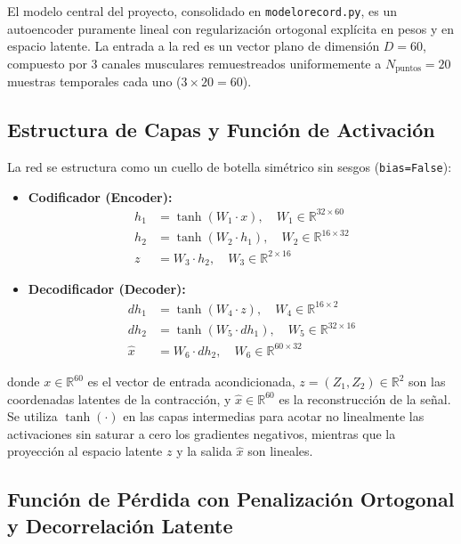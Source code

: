\documentclass[11pt,a4paper,openany]{book}
\theoremstyle{definition}
\begin{document}
El modelo central del proyecto, consolidado en \texttt{modelorecord.py}, es un autoencoder puramente lineal con regularización ortogonal explícita en pesos y en espacio latente. La entrada a la red es un vector plano de dimensión $D = 60$, compuesto por 3 canales musculares remuestreados uniformemente a $N_{\text{puntos}} = 20$ muestras temporales cada uno ($3 \times 20 = 60$).

\subsection{Estructura de Capas y Función de Activación}
\label{subsec:estructura_capas}

La red se estructura como un cuello de botella simétrico sin sesgos (\texttt{bias=False}):
\begin{itemize}
    \item \textbf{Codificador (Encoder):}
    \begin{align}
        h_1 &= \tanh(W_1 \cdot x), \quad W_1 \in \mathbb{R}^{32 \times 60} \\
        h_2 &= \tanh(W_2 \cdot h_1), \quad W_2 \in \mathbb{R}^{16 \times 32} \\
        z &= W_3 \cdot h_2, \quad W_3 \in \mathbb{R}^{2 \times 16}
    \end{align}
    \item \textbf{Decodificador (Decoder):}
    \begin{align}
        dh_1 &= \tanh(W_4 \cdot z), \quad W_4 \in \mathbb{R}^{16 \times 2} \\
        dh_2 &= \tanh(W_5 \cdot dh_1), \quad W_5 \in \mathbb{R}^{32 \times 16} \\
        \hat{x} &= W_6 \cdot dh_2, \quad W_6 \in \mathbb{R}^{60 \times 32}
    \end{align}
\end{itemize}
donde $x \in \mathbb{R}^{60}$ es el vector de entrada acondicionada, $z = (Z_1, Z_2) \in \mathbb{R}^2$ son las coordenadas latentes de la contracción, y $\hat{x} \in \mathbb{R}^{60}$ es la reconstrucción de la señal. Se utiliza $\tanh(\cdot)$ en las capas intermedias para acotar no linealmente las activaciones sin saturar a cero los gradientes negativos, mientras que la proyección al espacio latente $z$ y la salida $\hat{x}$ son lineales.

\subsection{Función de Pérdida con Penalización Ortogonal y Decorrelación Latente}
\label{subsec:perdida_ortogonal}
\end{document}
